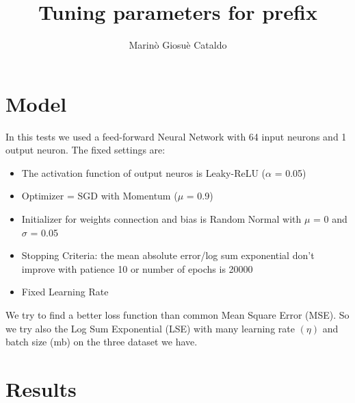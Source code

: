 \documentclass[10pt]{article}
\begin{document}
\title{Tuning parameters for prefix}


\author[$1$]{Marinò Giosuè Cataldo}

\maketitle

\section{Model}
	In this tests we used a feed-forward Neural Network with 64 input neurons and 1 output neuron.
	The fixed settings are:	
	\begin{itemize}
		\item The activation function of output neuros is Leaky-ReLU ($\alpha$ = 0.05)
		\item Optimizer = SGD with Momentum ($\mu$ = 0.9)
		\item Initializer for weights connection and bias is Random Normal with $\mu$ = 0 and $\sigma$ = 0.05
		\item Stopping Criteria: the mean absolute error/log sum exponential don't improve with patience 10 or number of epochs is 20000
		\item Fixed Learning Rate
	\end{itemize}
	We try to find a better loss function than common Mean Square Error (MSE). So we try also the Log Sum Exponential (LSE) with many learning rate $(\eta)$ and batch size (mb) on the three dataset we have.
\section{Results}

 
\end{document}
